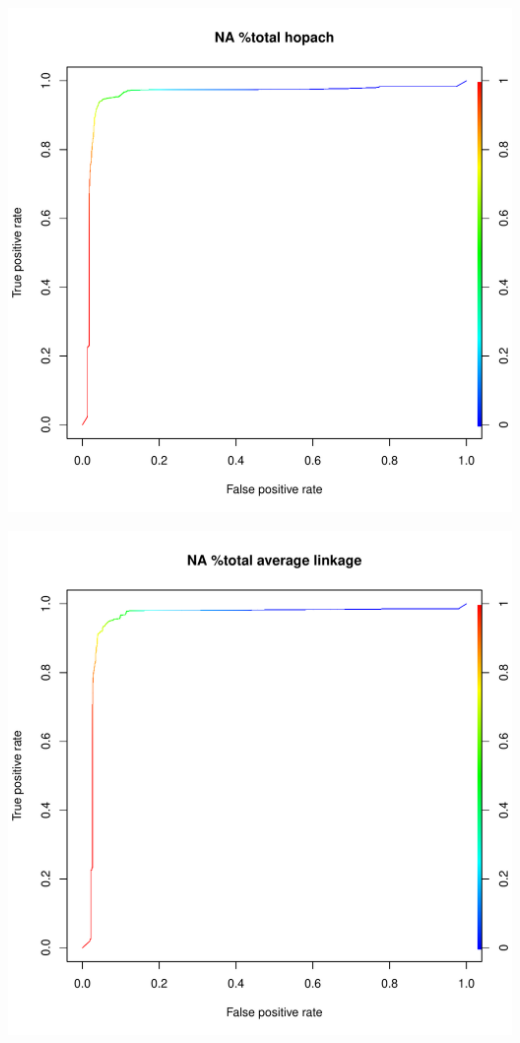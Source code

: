 \documentclass[11pt,a4paper,twoside]{report}\usepackage[]{graphicx}\usepackage[]{color}
\makeatletter
\def\maxwidth{ %
  \ifdim\Gin@nat@width>\linewidth
    \linewidth
  \else
    \Gin@nat@width
  \fi
}
\newenvironment{knitrout}{}{} %
\makeatother
\begin{document}
\begin{knitrout}
\includegraphics[width=\maxwidth]{figure/fig_code-19} 

\includegraphics[width=\maxwidth]{figure/fig_code-20} 


\end{knitrout}
\end{document}
